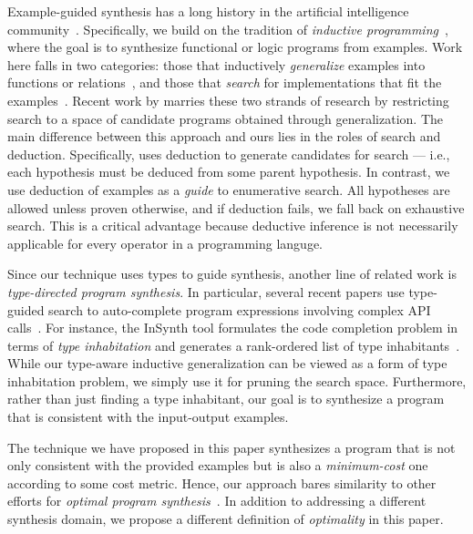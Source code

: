 Example-guided synthesis has a long history in the artificial
intelligence
community~\cite{lieberman2001your,kitzelmann2,gulwani-ml}. Specifically,
we build on the tradition of {\em inductive
programming}~\cite{kitzelmann-survey,KitzelmannS06,ilp}, where the
goal is to synthesize functional or logic programs from examples. Work
here falls in two categories: those that inductively {\em generalize}
examples into functions or relations~\cite{KitzelmannS06}, and those
that {\em search} for implementations that fit the
examples~\cite{Katayama08,Olsson95}. Recent work by \cite{kitzelmann}
marries these two strands of research by restricting search to a space
of candidate programs obtained through generalization.  The main
difference between this approach and ours lies in the roles of search
and deduction.  Specifically, \cite{kitzelmann} uses deduction to
generate candidates for search --- i.e., each hypothesis must be
deduced from some parent hypothesis. In contrast, we use deduction of
examples as a {\em guide} to enumerative search. All hypotheses are
allowed unless proven otherwise, and if deduction fails, we fall back
on exhaustive search.  This is a critical advantage because deductive
inference is not necessarily applicable for every operator in a
programming languge.

Since our technique uses types to guide synthesis, another line of
related work is \emph{type-directed program synthesis}.  In
particular, several recent papers use type-guided search to
auto-complete program expressions involving complex API
calls~\cite{perelman2012,gvero2013,mandelin2005jungloid}.  For
instance, the {\sc InSynth} tool formulates the code completion
problem in terms of \emph{type inhabitation} and generates a
rank-ordered list of type inhabitants~\cite{gvero2013}.  While our
type-aware inductive generalization can be viewed as a form of type
inhabitation problem, we simply use it for pruning the search
space. Furthermore, rather than just finding a type inhabitant, our
goal is to synthesize a program that is consistent with the
input-output examples.

The technique we have proposed in this paper synthesizes a program
that is not only consistent with the provided examples but is also a
\emph{minimum-cost} one according to some cost metric.  Hence, our
approach bares similarity to other efforts for \emph{optimal program
synthesis}~\cite{bloem2009better,dilligoptimal,chaudhuri2014bridging}.
In addition to addressing a different synthesis domain, we propose a
different definition of \emph{optimality} in this paper.


